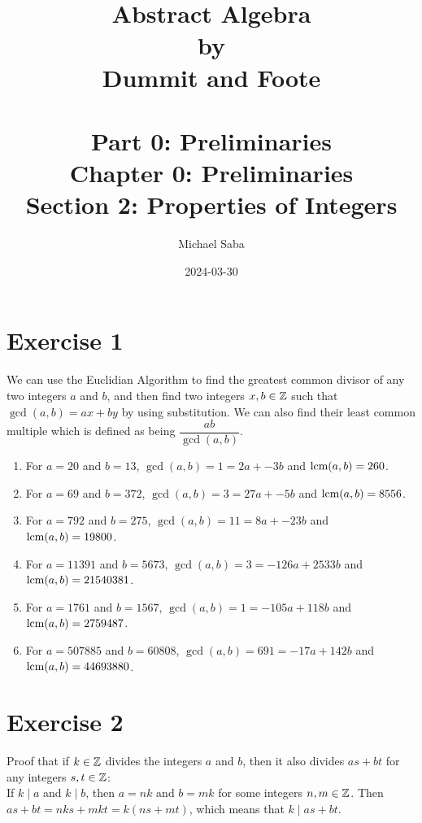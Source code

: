 \documentclass[12pt]{article}
\title{%
    \Huge Abstract Algebra \\
    \large by \\
    \Large Dummit and Foote \\~\\
    \huge Part 0: Preliminaries \\
    \LARGE Chapter 0: Preliminaries \\
    \Large Section 2: Properties of Integers
}
\date{2024-03-30}
\author{Michael Saba}
\begin{document}
    \maketitle
    \newpage
    \setlength{\parindent}{0pt}

    \section*{Exercise 1}
    We can use the Euclidian Algorithm to find the 
    greatest common divisor of any two integers $a$ and $b$,
    and then find two integers $x, b \in \mathbb{Z}$
    such that $\gcd(a, b) = ax + by$ by using substitution.
    We can also find their least common multiple
    which is defined as being $\dfrac{ab}{\gcd(a, b)}$.
    \begin{enumerate}[label=\textbf{\alph*.}]
        \item 
            For $a = 20$ and $b = 13$,
            $\gcd(a, b) = 1 = 2a + -3b$
            and $\text{lcm}(a, b) = 260$.
        \item 
            For $a = 69$ and $b = 372$,
            $\gcd(a, b) = 3 = 27a + -5b$
            and $\text{lcm}(a, b) = 8556$.
        \item 
            For $a = 792$ and $b = 275$,
            $\gcd(a, b) = 11 = 8a + -23b$
            and $\text{lcm}(a, b) = 19800$.
        \item 
            For $a = 11391$ and $b = 5673$,
            $\gcd(a, b) = 3 = -126a + 2533b$
            and $\text{lcm}(a, b) = 21540381$.
        \item 
            For $a = 1761$ and $b = 1567$,
            $\gcd(a, b) = 1 = -105a + 118b$
            and $\text{lcm}(a, b) = 2759487$.
        \item 
            For $a = 507885$ and $b = 60808$,
            $\gcd(a, b) = 691 = -17a + 142b$
            and $\text{lcm}(a, b) = 44693880$.            
    \end{enumerate} 

    \section*{Exercise 2}
    Proof that if $k \in \mathbb{Z}$ divides the integers $a$ and $b$,
    then it also divides $as + bt$ for any integers $s, t \in \mathbb{Z}$: \\
    If $k \mid a$ and $k \mid b$,
    then $a = nk$ and $b = mk$ for some integers $n, m \in \mathbb{Z}$.
    Then $as + bt = nks + mkt = k(ns + mt)$,
    which means that $k \mid as + bt$. \\
\end{document}
